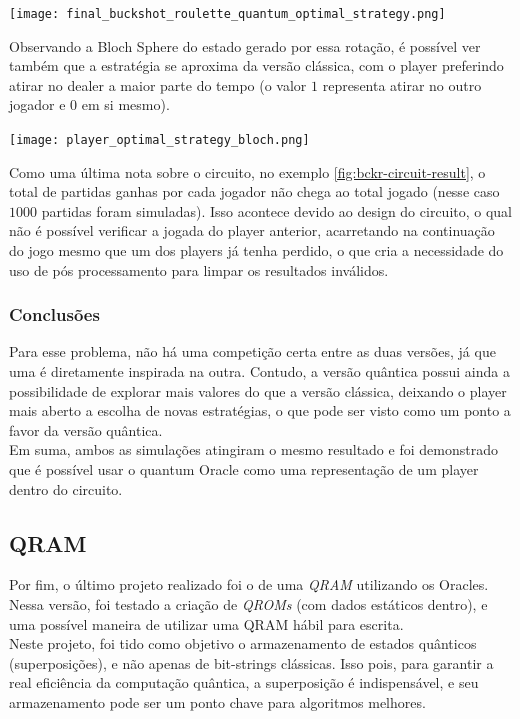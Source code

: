 \documentclass{article}
\begin{document}
\begin{center}
	\texttt{[image: final\_buckshot\_roulette\_quantum\_optimal\_strategy.png]}
	\label{fig:bckr-circuit-result}
\end{center}

Observando a Bloch Sphere do estado gerado por essa rotação, é possível ver também que a estratégia se aproxima da versão clássica, com o player preferindo atirar no dealer a maior parte do tempo (o valor $1$ representa atirar no outro jogador e $0$ em si mesmo).

\begin{center}
	\texttt{[image: player\_optimal\_strategy\_bloch.png]}
	\label{fig:bckr-bloch-sphere-best-strategy}
\end{center}

Como uma última nota sobre o circuito, no exemplo \ref{fig:bckr-circuit-result}, o total de partidas ganhas por cada jogador não chega ao total jogado (nesse caso $1000$ partidas foram simuladas). Isso acontece devido ao design do circuito, o qual não é possível verificar a jogada do player anterior, acarretando na continuação do jogo mesmo que um dos players já tenha perdido, o que cria a necessidade do uso de pós processamento para limpar os resultados inválidos.

\subsubsection{Conclusões}
Para esse problema, não há uma competição certa entre as duas versões, já que uma é diretamente inspirada na outra. Contudo, a versão quântica possui ainda a possibilidade de explorar mais valores do que a versão clássica, deixando o player mais aberto a escolha de novas estratégias, o que pode ser visto como um ponto a favor da versão quântica.\\
Em suma, ambos as simulações atingiram o mesmo resultado e foi demonstrado que é possível usar o quantum Oracle como uma representação de um player dentro do circuito.

\subsection{QRAM} \label{qram}
Por fim, o último projeto realizado foi o de uma \emph{QRAM} utilizando os Oracles. Nessa versão, foi testado a criação de \emph{QROMs} (com dados estáticos dentro), e uma possível maneira de utilizar uma QRAM hábil para escrita.\\
Neste projeto, foi tido como objetivo o armazenamento de estados quânticos (superposições), e não apenas de bit-strings clássicas. Isso pois, para garantir a real eficiência da computação quântica, a superposição é indispensável, e seu armazenamento pode ser um ponto chave para algoritmos melhores.
\end{document}
